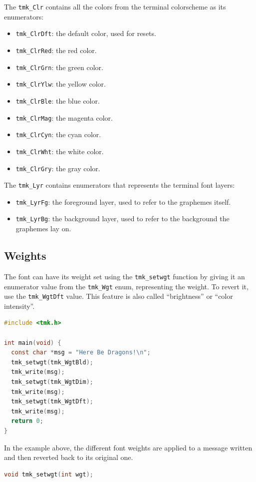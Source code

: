 \documentclass{report}
\begin{document}
The \texttt{tmk\_Clr} contains all the colors from the terminal colorscheme as its enumerators:
\begin{itemize}
  \item \texttt{tmk\_ClrDft}: the default color, used for resets.
  \item \texttt{tmk\_ClrRed}: the red color.
  \item \texttt{tmk\_ClrGrn}: the green color.
  \item \texttt{tmk\_ClrYlw}: the yellow color.
  \item \texttt{tmk\_ClrBle}: the blue color.
  \item \texttt{tmk\_ClrMag}: the magenta color.
  \item \texttt{tmk\_ClrCyn}: the cyan color.
  \item \texttt{tmk\_ClrWht}: the white color.
  \item \texttt{tmk\_ClrGry}: the gray color.
\end{itemize}

The \texttt{tmk\_Lyr} contains enumerators that represents the terminal font layers:
\begin{itemize}
  \item \texttt{tmk\_LyrFg}: the foreground layer, used to refer to the graphemes itself.
  \item \texttt{tmk\_LyrBg}: the background layer, used to refer to the background the graphemes lay on.
\end{itemize}
\subsection{Weights}
The font can have its weight set using the \texttt{tmk\_setwgt} function by giving it an enumerator value from the \texttt{tmk\_Wgt} enum, representing the weight. To revert it, use the \texttt{tmk\_WgtDft} value. This feature is also called ``brightness'' or ``color intensity''.
\begin{lstlisting}[language=c,caption=an example that sets font weights.]
#include <tmk.h>

int main(void) {
  const char *msg = "Here Be Dragons!\n";
  tmk_setwgt(tmk_WgtBld);
  tmk_write(msg);
  tmk_setwgt(tmk_WgtDim);
  tmk_write(msg);
  tmk_setwgt(tmk_WgtDft);
  tmk_write(msg);
  return 0;
}
\end{lstlisting}

In the example above, the different font weights are applied to a message written and then reverted back to its original one.
\begin{lstlisting}[language=c,caption=the declaration of the \texttt{tmk\_setwgt} function.]
void tmk_setwgt(int wgt);
\end{lstlisting}
\end{document}
